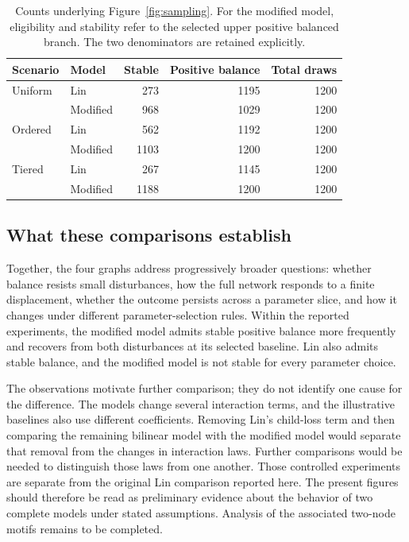 \documentclass{article}
\begin{document}
\begin{table}[H]
\centering
\small
\begin{tabular}{llrrr}
\toprule
Scenario & Model & Stable & Positive balance & Total draws\\
\midrule
Uniform & Lin      & 273  & 1195 & 1200\\
        & Modified & 968  & 1029 & 1200\\
Ordered & Lin      & 562  & 1192 & 1200\\
        & Modified & 1103 & 1200 & 1200\\
Tiered  & Lin      & 267  & 1145 & 1200\\
        & Modified & 1188 & 1200 & 1200\\
\bottomrule
\end{tabular}
\caption{Counts underlying Figure~\ref{fig:sampling}. For the modified
model, eligibility and stability refer to the selected upper positive
balanced branch. The two denominators are retained explicitly.}
\label{tab:sampling}
\end{table}

\subsection{What these comparisons establish}
Together, the four graphs address progressively broader questions: whether
balance resists small disturbances, how the full network responds to a
finite displacement, whether the outcome persists across a parameter slice,
and how it changes under different parameter-selection rules. Within the
reported experiments, the modified model admits stable positive balance
more frequently and recovers from both disturbances at its selected
baseline. Lin also admits stable balance, and the modified model is not
stable for every parameter choice.

The observations motivate further comparison; they do not identify one
cause for the difference. The models change several interaction terms,
and the illustrative baselines also use different coefficients. Removing
Lin's child-loss term and then comparing the remaining bilinear model
with the modified model would separate that removal from the changes in
interaction laws. Further comparisons would be needed to distinguish those
laws from one another. Those controlled experiments are separate from the
original Lin comparison reported here. The present figures should therefore
be read as preliminary evidence about the behavior of two complete models
under stated assumptions. Analysis of the associated two-node motifs
remains to be completed.
\FloatBarrier
\end{document}
